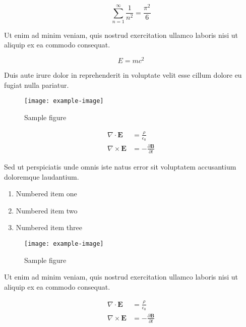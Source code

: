 \documentclass{article}
\begin{document}
\begin{equation}
    \sum_{n=1}^{\infty} \frac{1}{n^2} = \frac{\pi^2}{6}
\end{equation}

Ut enim ad minim veniam, quis nostrud exercitation ullamco laboris nisi ut aliquip ex ea commodo consequat.

\begin{equation}
    E = mc^2
\end{equation}

Duis aute irure dolor in reprehenderit in voluptate velit esse cillum dolore eu fugiat nulla pariatur.

\begin{figure}[h]
    \centering
    \texttt{[image: example-image]}
    \caption{Sample figure}
    \label{fig:sample}
\end{figure}

\begin{align}
    \nabla \cdot \mathbf{E} &= \frac{\rho}{\epsilon_0} \\
    \nabla \times \mathbf{E} &= -\frac{\partial \mathbf{B}}{\partial t}
\end{align}

Sed ut perspiciatis unde omnis iste natus error sit voluptatem accusantium doloremque laudantium.

\begin{enumerate}
\item Numbered item one
\item Numbered item two
\item Numbered item three
\end{enumerate}

\begin{figure}[h]
    \centering
    \texttt{[image: example-image]}
    \caption{Sample figure}
    \label{fig:sample}
\end{figure}

Ut enim ad minim veniam, quis nostrud exercitation ullamco laboris nisi ut aliquip ex ea commodo consequat.

\begin{align}
    \nabla \cdot \mathbf{E} &= \frac{\rho}{\epsilon_0} \\
    \nabla \times \mathbf{E} &= -\frac{\partial \mathbf{B}}{\partial t}
\end{align}
\end{document}
